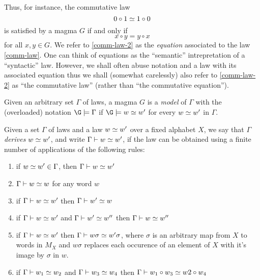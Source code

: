Thus, for instance, the commutative law
\begin{equation}\label{comm-law}
  0 \circ 1 \simeq 1 \circ 0
\end{equation}
is satisfied by a magma $G$ if and only if
\begin{equation}\label{comm-law-2}
 x \circ y = y \circ x
\end{equation}
for all $x, y \in G$.  We refer to \eqref{comm-law-2} as the \emph{equation} associated to the law \eqref{comm-law}.  One can think of equations as the ``semantic'' intrepretation of a ``syntactic'' law.  However, we shall often abuse notation and a law with its associated equation thus we shall (somewhat carelessly) also refer to \eqref{comm-law-2} as ``the commutative law'' (rather than ``the commutative equation'').

\begin{definition}[Models]\label{models-def} Given an arbitrary set $\Gamma$ of laws, a magma $G$ is a \emph{model} of $\Gamma$ with the (overloaded) notation $\G\models\Gamma$ if $\G\models w\formaleq w'$ for every $w\simeq w'$ in $\Gamma$.
\end{definition}

\begin{definition}[Derivation]\label{derivation-def} Given a set $\Gamma$ of laws and a law $w\simeq w'$ over a fixed alphabet $X$, we say that $\Gamma$ \emph{derives} $w\simeq w'$, and write $\Gamma\vdash w\simeq w'$, if the law can be obtained using a finite number of applications of the following rules:
  \begin{enumerate}
    \item if $w\simeq w' \in \Gamma$, then $\Gamma\vdash w\simeq w'$
    \item $\Gamma\vdash w\simeq w$ for any word $w$
    \item if $\Gamma\vdash w\simeq w'$ then $\Gamma\vdash w'\simeq w$
    \item if $\Gamma\vdash w\simeq w'$ and $\Gamma\vdash w'\simeq w''$ then $\Gamma\vdash w\simeq w''$
    \item if $\Gamma\vdash w\simeq w'$ then $\Gamma\vdash w\sigma\simeq w'\sigma$, where $\sigma$ is an arbitrary map from $X$ to words in $M_X$ and $w\sigma$ replaces each occurence of an element of $X$ with it's image by $\sigma$ in $w$.
    \item if $\Gamma\vdash w_1\simeq w_2$ and $\Gamma\vdash w_3\simeq w_4$ then $\Gamma\vdash w_1 \circ w_3\simeq w2\circ w_4$
  \end{enumerate}
\end{definition}

